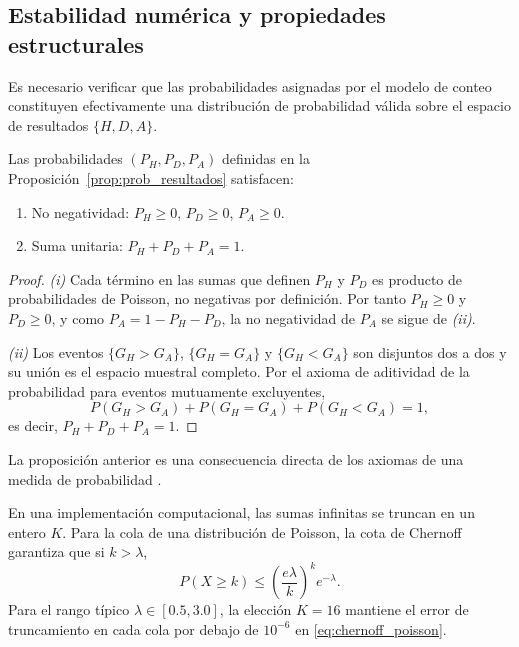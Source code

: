 \subsection{Estabilidad num\'erica y propiedades estructurales}
\label{subsec:buena_definicion}
\label{subsec:propiedades_estructurales}

Es necesario verificar que las probabilidades asignadas por el modelo de conteo constituyen efectivamente una distribuci\'on de probabilidad v\'alida sobre el espacio de resultados $\{H, D, A\}$.

\begin{prop}
	\label{prop:buena_definicion}
	Las probabilidades $(P_H, P_D, P_A)$ definidas en la 	Proposici\'on~\ref{prop:prob_resultados} satisfacen:
	\begin{enumerate}
		\item[(i)] No negatividad: $P_H \geq 0$, $P_D \geq 0$, $P_A \geq 0$.
		\item[(ii)] Suma unitaria: $P_H + P_D + P_A = 1$.
	\end{enumerate}
\end{prop}

\begin{proof}
	\textit{(i)} Cada t\'ermino en las sumas que definen $P_H$ y $P_D$ es producto de probabilidades de Poisson, no negativas por definici\'on. Por tanto $P_H \geq 0$ y $P_D \geq 0$, y como $P_A = 1 - P_H - P_D$, la no negatividad de $P_A$ se sigue de \textit{(ii)}.
	
	\textit{(ii)} Los eventos $\{G_H > G_A\}$, $\{G_H = G_A\}$ y $\{G_H < G_A\}$ son disjuntos dos a dos y su uni\'on es el espacio muestral completo. Por el axioma de aditividad de la probabilidad para eventos mutuamente excluyentes,
	\[
	P(G_H > G_A) + P(G_H = G_A) + P(G_H < G_A) = 1,
	\]
	es decir, $P_H + P_D + P_A = 1$.
\end{proof}

La proposici\'on anterior es una consecuencia directa de los axiomas de una medida de probabilidad \cite{arriojas2004}.

En una implementaci\'on computacional, las sumas infinitas se truncan en un entero $K$. Para la cola de una distribuci\'on de Poisson, la cota de Chernoff \cite{casella2002} garantiza que si $k > \lambda$,
\begin{equation}\label{eq:chernoff_poisson}
	P(X \geq k) \leq \left(\frac{e\lambda}{k}\right)^k e^{-\lambda}.
\end{equation}
Para el rango t\'ipico $\lambda \in [0{.}5, 3{.}0]$, la elecci\'on $K = 16$ mantiene el error de truncamiento en cada cola por debajo de $10^{-6}$ en \ref{eq:chernoff_poisson}.

